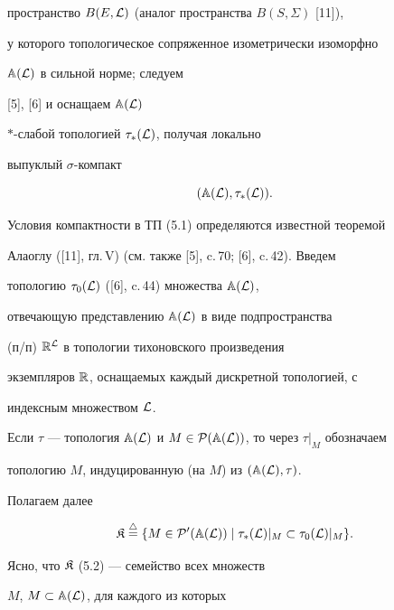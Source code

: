 пространство $B(E,{\cal L})$ (аналог пространства $B(S,\Sigma)$ [11]),


у которого топологическое сопряженное изометрически изоморфно


${\Bbb A}({\cal L})$ в сильной норме; следуем


[5], [6] и оснащаем ${\Bbb A}({\cal L})$\;


$*$-слабой топологией ${{\tau}_*}({\cal L})$, получая локально


выпуклый $\sigma$-компакт


\begin{equation}


({\Bbb A}({\cal L}),{{\tau}_*}({\cal L})).


\end{equation}





Условия компактности в ТП (5.1) определяются известной теоремой


Алаоглу ([11], гл.\,V) (см. также [5], c.\,70; [6], c.\,42). Введем


топологию ${{\tau}_0}({\cal L})$ ([6], c.\,44) множества ${\Bbb A}({\cal L})$,


отвечающую представлению ${\Bbb A}({\cal L})$ в виде подпространства


(п/п) ${\Bbb R}^{\cal L}$ в топологии тихоновского произведения


экземпляров ${\Bbb R}$, оснащаемых каждый дискретной топологией, с


индексным множеством ${\cal L}$.


Если $\tau$ --- топология ${\Bbb A}({\cal L})$ и $M \in


{\cal P}({\Bbb A}({\cal L}))$, то через ${\tau}|_M$ обозначаем


топологию $M$, индуцированную (на $M$) из $({\Bbb A}({\cal L}),\tau)$.


Полагаем далее


\begin{equation}


{\frak K} \stac \{M \in {{\cal P}'}({\Bbb A}({\cal L})) \mid


{{\tau}_*}({\cal L})|_M \subset {{\tau}_0}({\cal L})|_M\}.


\end{equation}


Ясно, что ${\frak K}$ (5.2) --- семейство всех множеств


$M$, $M \subset {{\Bbb A}({\cal L})}$, для каждого из которых


